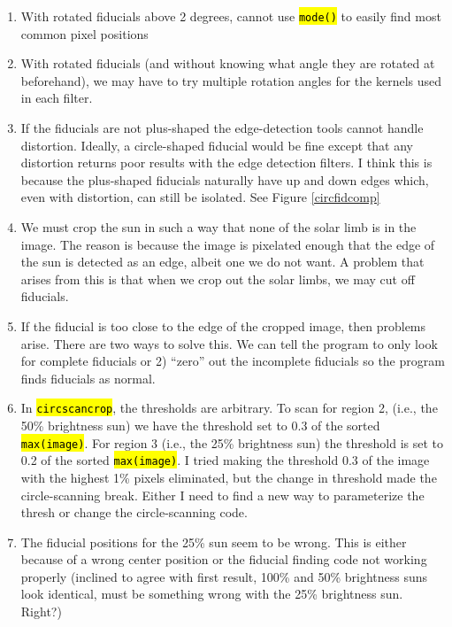 \documentclass[10pt]{article}
\begin{document}
    \begin{enumerate}
        \item With rotated fiducials above 2 degrees, cannot use \hl{\texttt{mode()}} to easily find most common pixel positions
        \item With rotated fiducials (and without knowing what angle they are rotated at beforehand), we may have to try multiple rotation angles for the kernels used in each filter.
        \item If the fiducials are not plus-shaped the edge-detection tools cannot handle distortion. Ideally, a circle-shaped fiducial would be fine except that any distortion returns poor results with the edge detection filters. I think this is because the plus-shaped fiducials naturally have up and down edges which, even with distortion, can still be isolated. See Figure \ref{circfidcomp}
        \item We must crop the sun in such a way that none of the solar limb is in the image. The reason is because the image is pixelated enough that the edge of the sun is detected as an edge, albeit one we do not want. A problem that arises from this is that when we crop out the solar limbs, we may cut off fiducials.
        \item If the fiducial is too close to the edge of the cropped image, then problems arise. There are two ways to solve this. We can tell the program to only look for complete fiducials or 2) ``zero'' out the incomplete fiducials so the program finds fiducials as normal.
        \item In \hl{\texttt{circscancrop}}, the thresholds are arbitrary. To scan for region 2, (i.e., the 50\% brightness sun) we have the threshold set to 0.3 of the sorted \hl{\texttt{max(image)}}. For region 3 (i.e., the 25\% brightness sun) the threshold is set to 0.2 of the sorted \hl{\texttt{max(image)}}. I tried making the threshold 0.3 of the image with the highest 1\% pixels eliminated, but the change in threshold made the circle-scanning break. Either I need to find a new way to parameterize the thresh or change the circle-scanning code. 
        \item The fiducial positions for the 25\% sun seem to be wrong. This is either because of a wrong center position or the fiducial finding code not working properly (inclined to agree with first result, 100\% and 50\% brightness suns look identical, must be something wrong with the 25\% brightness sun. Right?)
    \end{enumerate}
\end{document}
